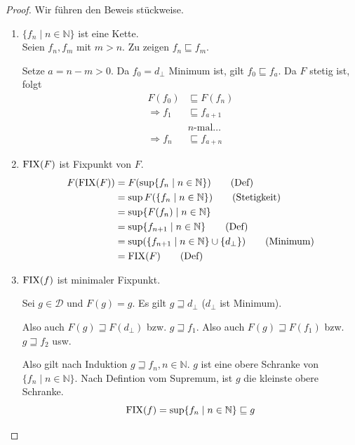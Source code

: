 \begin{proof}
    Wir führen den Beweis stückweise.
    \begin{enumerate}
        \item $\{ f_n \mid n \in \mathbb{N} \}$ ist eine Kette. \\
            Seien $f_n, f_m$ mit $m > n$. Zu zeigen $f_n \sqsubseteq f_m$.

            Setze $a = n - m > 0$. Da $f_0 = d_{\bot}$ Minimum ist, gilt $f_0 \sqsubseteq f_a$. Da $F$ stetig ist, folgt
            \begin{align*}
                F(f_0) & \sqsubseteq F(f_n) \\
                \Rightarrow f_1 & \sqsubseteq f_{a+1} \\
                & n\text{-mal} \dots \\
                \Rightarrow f_n & \sqsubseteq f_{a+n}
            \end{align*}

        \item $\operatorname{FIX}(F)$ ist Fixpunkt von $F$.
            \begin{align*}
                F(\operatorname{FIX}(F)) & = F(\sup \{f_n \mid n \in \mathbb{N} \}) \tag{Def} \\
                & = \sup F(\{f_n \mid n \in \mathbb{N} \}) \tag{Stetigkeit} \\
                & = \sup \{F(f_n) \mid n \in \mathbb{N} \} \\
                & = \sup \{f_{n+1} \mid n \in \mathbb{N} \} \tag{Def} \\
                & = \sup (\{f_{n+1} \mid n \in \mathbb{N} \} \cup \{ d_{\bot} \}) \tag{Minimum} \\
                & = \operatorname{FIX}(F) \tag{Def}
            \end{align*}

        \item $\operatorname{FIX}(f)$ ist minimaler Fixpunkt.

            Sei $g \in \mathcal{D}$ und $F(g) = g$. Es gilt $g \sqsupseteq d_{\bot}$ ($d_{\bot}$ ist Minimum).

            Also auch $F(g) \sqsupseteq F(d_{\bot})$ bzw. $g \sqsupseteq f_1$. Also auch $F(g) \sqsupseteq F(f_1)$ bzw. $g \sqsupseteq f_2$ usw.

            Also gilt nach Induktion $g \sqsupseteq f_n, n \in \mathbb{N}$. $g$ ist eine obere Schranke von $\{f_n \mid n \in \mathbb{N} \}$. Nach Defintion vom Supremum, ist $g$ die kleinste obere Schranke.
            \[ \operatorname{FIX}(f) = \sup \{ f_n \mid n \in \mathbb{N} \} \sqsubseteq g \]
    \end{enumerate}
\end{proof}

